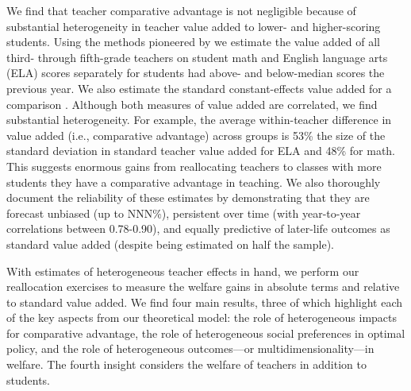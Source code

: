 \documentclass[12pt]{article}
\theoremstyle{definition}
\theoremstyle{definition}
\theoremstyle{definition}
\theoremstyle{definition}
\begin{document}
We find that teacher comparative advantage is not negligible because of substantial heterogeneity in teacher value added to lower- and higher-scoring students. Using the methods pioneered by \citet{Delgado2020} we estimate the value added of all third- through fifth-grade teachers on student math and English language arts (ELA) scores separately for students had above- and below-median scores the previous year. We also estimate the standard constant-effects value added for a comparison \citep{chetty2014measuring1}. Although both measures of value added are correlated, we find substantial heterogeneity. For example, the average within-teacher difference in value added (i.e., comparative advantage) across groups is 53\% the size of the standard deviation in standard teacher value added for ELA and 48\% for math. This suggests enormous gains from reallocating teachers to classes with more students they have a comparative advantage in teaching. We also thoroughly document the reliability of these estimates by demonstrating that they are forecast unbiased (up to NNN\%), persistent over time (with year-to-year correlations between 0.78-0.90), and equally predictive of later-life outcomes as standard value added (despite being estimated on half the sample).


With estimates of heterogeneous teacher effects in hand, we perform our reallocation exercises to measure the welfare gains in absolute terms and relative to standard value added. We find four main results, three of which highlight each of the key aspects from our theoretical model: the role of heterogeneous impacts for comparative advantage,  the role of heterogeneous social preferences in optimal policy, and the role of heterogeneous outcomes---or multidimensionality---in welfare. The fourth insight considers the welfare of teachers in addition to students.
\end{document}
